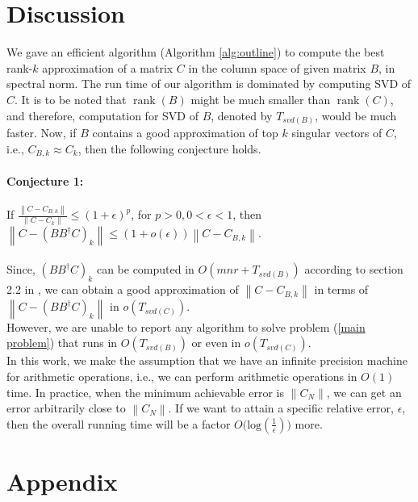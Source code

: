 \documentclass[11pt]{article}
\newcommand{\rank}{\operatorname{rank}}
\newcommand{\norm}[1]{\left\|#1\right\|}
\begin{document}
\section{Discussion}
We gave an efficient algorithm (Algorithm \ref{alg:outline}) to compute the best rank-$k$ approximation of a matrix $C$ in the column space of given matrix $B$, in spectral norm. The run time of our algorithm is dominated by computing SVD of $C$. It is to be noted that $\rank(B)$ might be much smaller than $\rank(C)$, and therefore, computation for SVD of $B$, denoted by $T_{svd(B)}$, would be much faster. Now, if $B$ contains a good approximation of top $k$ singular vectors of $C$, i.e., $C_{B, k} \approx C_k$, then the following conjecture holds.\\
\\
\textbf{Conjecture 1:}\\
\\
If $\frac{\norm{{C} - C_{B, k}}}{\norm{C - C_k}} \leq (1+\epsilon)^p$, for $p > 0, 0 < \epsilon < 1$, then
$\norm{{C} - {(BB^{\dagger}C)}_k} \leq (1+o(\epsilon))\norm{C - C_{B, k}}$. \\
\\
Since,  ${(BB^{\dagger}C)}_k$ can be computed in $O(mnr + T_{svd(B)})$ according to section 2.2 in \cite{BDM}, we can obtain a good approximation of $\norm{{C} - C_{B, k}}$ in terms of $\norm{{C} - {(BB^{\dagger}C)}_k}$ in $o(T_{svd(C)})$.\\
However, we are unable to report any algorithm to solve problem (\ref{main problem}) that runs in $O(T_{svd(B)})$ or even in $o(T_{svd(C)})$. \\
In this work, we make the assumption that we have an infinite precision machine for arithmetic operations, i.e., we can perform arithmetic operations in $O(1)$ time. In practice, when the minimum achievable error is $\norm{C_N}$, we can get an error arbitrarily close to $\norm{C_N}$. If we want to attain a specific relative error, $\epsilon$,  then the overall running time will be a factor $O\Big(\text{log}(\frac{1}{\epsilon})\Big)$ more.  


\section{Appendix}
\end{document}
